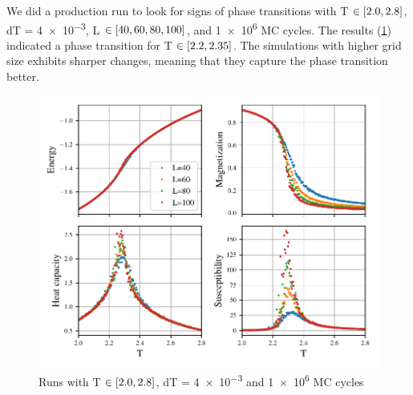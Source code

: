 We did a production run to look for signs of phase transitions with T $\in
\left[2.0,2.8\right]$, dT = \num{4e-3}, L $\in \left[40,60,80,100\right]$, and \num{1e6} MC
cycles.
The results (\cref{fig:phase}) indicated a phase transition for T $\in
\left[2.2,2.35\right]$. The simulations with higher grid size exhibits sharper
changes, meaning that they capture the phase transition better.


\begin{figure}[H]
  \centering
  \includegraphics[width=\textwidth]{../figures/phase.pdf}
  \caption{Runs with T $\in \left[2.0,2.8\right]$, dT = \num{4e-3} and
   \num{1e6} MC cycles}
  \label{fig:phase}
\end{figure}



